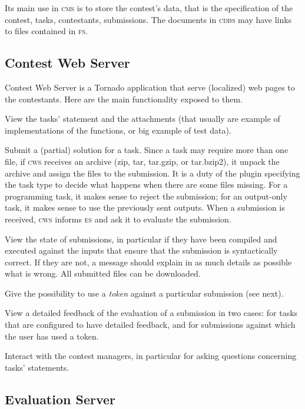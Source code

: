 \documentclass[a4paper,8pt]{amsart}
\newcommand{\CMS}{\textsc{cms}}
\newcommand{\FS}{\textsc{fs}}
\newcommand{\CDBS}{\textsc{cdbs}}
\newcommand{\CWS}{\textsc{cws}}
\newcommand{\ES}{\textsc{es}}
\newenvironment{squishlist}{%
  \begin{list}{\textbullet}%
    { \setlength{\itemsep}{0pt}%
      \setlength{\parsep}{3pt}%
      \setlength{\topsep}{3pt}%
      \setlength{\partopsep}{0pt}%
      \setlength{\leftmargin}{1.5em}%
      \setlength{\labelwidth}{1em}%
      \setlength{\labelsep}{0.5em} }%
}{\end{list}}
\begin{document}
\begin{multicols}{2}
  Its main use in \CMS{} is to store the contest's data, that is the
  specification of the contest, tasks, contestants, submissions. The
  documents in \CDBS{} may have links to files contained in \FS{}.

  \subsection{Contest Web Server}

  Contest Web Server is a Tornado application that serve (localized)
  web pages to the contestants. Here are the main functionality
  exposed to them.
  \begin{squishlist}
  \item View the tasks' statement and the attachments (that usually
    are example of implementations of the functions, or big example of
    test data).
  \item Submit a (partial) solution for a task. Since a task may
    require more than one file, if \CWS{} receives an archive (zip,
    tar, tar.gzip, or tar.bzip2), it unpack the archive and assign the
    files to the submission. It is a duty of the plugin specifying the
    task type to decide what happens when there are some files
    missing. For a programming task, it makes sense to reject the
    submission; for an output-only task, it makes sense to use the
    previously sent outputs. When a submission is received, \CWS{}
    informs \ES{} and ask it to evaluate the submission.
  \item View the state of submissions, in particular if they have been
    compiled and executed against the inputs that ensure that the
    submission is syntactically correct. If they are not, a message
    should explain in as much details as possible what is wrong. All
    submitted files can be downloaded.
  \item Give the possibility to use a \emph{token\/} against a particular
    submission (see next).
  \item View a detailed feedback of the evaluation of a submission in
    two cases: for tasks that are configured to have detailed
    feedback, and for submissions against which the user has used a
    token.
  \item Interact with the contest managers, in particular for asking
    questions concerning tasks' statements.
  \end{squishlist}

  \subsection{Evaluation Server}


\end{multicols}
\end{document}
